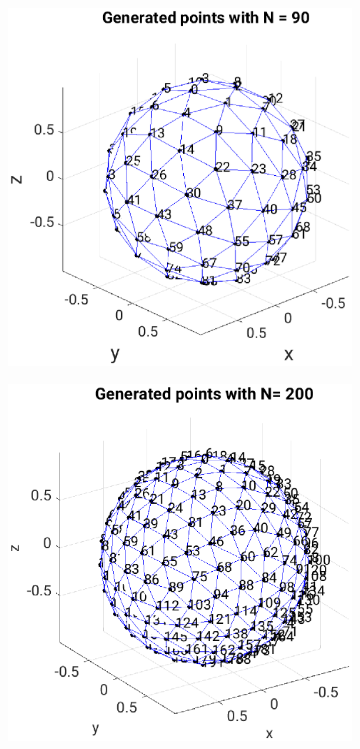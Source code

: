 \begin{figure}[H]
\begin{subfigure}[b]{0.4\textwidth}
         \includegraphics[width=1.3\textwidth,left]{Graphics/arbitrary_nomals90.eps}
         \label{fig:arbitary_n90}
     \end{subfigure}
         \hfill
     \begin{subfigure}[b]{0.4\textwidth}
         \centering
         \includegraphics[width=1.3\textwidth]{Graphics/arbitrary_nomals200.eps}

\end{subfigure}
\end{figure}
